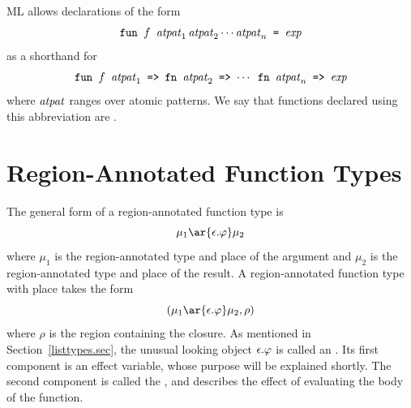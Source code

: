 \documentclass[12pt]{book}
\begin{document}
ML allows declarations of the form
$$\hbox{\tt fun $f$ ${\it atpat}_1\,{\it atpat}_2 \cdots {\it atpat}_n$ = $\hbox{\it exp}$}$$
as a shorthand for 
$$\hbox{\tt fun $f$ ${\it atpat}_1$ => fn ${\it atpat}_2$ => $\cdots$ fn ${\it atpat}_n$ => $\hbox{\it exp}$}$$
where ${\it atpat}$ ranges over atomic patterns.
We say that functions declared using this abbreviation are . 
\section{Region-Annotated Function Types}
\label{functiontypes.sec}
The general form of a region-annotated function type is
$$\mu_1\ar{\epsilon.\rea}\mu_2$$
where $\mu_1$ is the region-annotated type and place of the argument
and $\mu_2$ is the region-annotated type and place of the result. A region-annotated
function type with place takes the form 
$$(\mu_1\ar{\epsilon.\rea}\mu_2, \rho)$$
where $\rho$ is the region containing the closure.
As mentioned in Section~\ref{listtypes.sec}, the unusual looking object
$\epsilon.\varphi$ is called an . Its first component
is an  effect variable, whose purpose will be explained shortly.
The second component is called the , and describes
the effect of evaluating the body of the function. 
\end{document}
